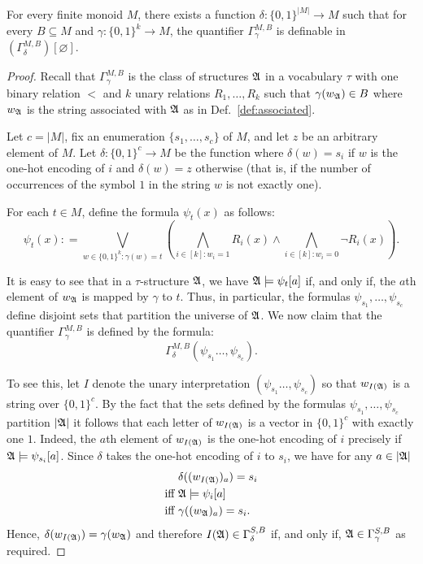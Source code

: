\documentclass[a4paper,UKenglish,cleveref, autoref, thm-restate, anonymous]{lipics-v2021}
\begin{document}
\begin{lemma}\label{lem:finitetuple}
    For every finite monoid $M$, there exists a function $\delta : \{0,1\}^{|M|} \rightarrow M$ such that for every $B \subseteq M$ and $\gamma : \{0,1\}^k \rightarrow M$, the quantifier $\Gamma^{M,B}_{\gamma}$ is definable in $(\Gamma^{M,B}_{\delta})[\varnothing]$.
  \end{lemma}
  \begin{proof}
    Recall that $\Gamma^{M,B}_{\gamma}$ is the class of structures $\mathfrak{A}$ in a vocabulary $\tau$ with one binary relation $<$ and $k$ unary relations $R_1,\ldots,R_k$ such that $\gamma(w_{\mathfrak{A}}) \in B$ where $w_{\mathfrak{A}}$ is the string associated with $\mathfrak{A}$ as in Def.~\ref{def:associated}.

        Let $c = |M|$, fix an enumeration $\{s_1,\ldots,s_c\}$ of $M$, and let $z$ be an arbitrary element of $M$.  Let $\delta : \{0,1\}^c \rightarrow M$ be the function where $\delta(w) = s_i$ if $w$ is the one-hot encoding of $i$ and $\delta(w) = z$ otherwise (that is, if the number of occurrences of the symbol $1$ in the string $w$ is not exactly one).

        For each $t \in M$, define the formula $\psi_t(x)$ as follows:
        $$ \psi_t(x) : = \bigvee_{w \in \{0,1\}^k : \gamma(w) = t} \left( \bigwedge_{i \in [k] : w_i = 1} R_i(x) \land \bigwedge_{i \in [k] : w_i = 0} \neg R_i(x) \right).$$

        It is easy to see that in a $\tau$-structure $\mathfrak{A}$, we have $\mathfrak{A} \models \psi_t[a]$ if, and only if, the $a$th element of $w_{\mathfrak{A}}$ is mapped by $\gamma$ to $t$.  Thus, in particular, the formulas $\psi_{s_1},\ldots,\psi_{s_c}$ define disjoint sets that partition the universe of $\mathfrak{A}$.  We now claim that the quantifier $\Gamma^{M,B}_{\gamma}$ is defined by the formula:
          $$ \Gamma^{M,B}_{\delta}(\psi_{s_1}\ldots,\psi_{s_c}).$$

          To see this, let $I$ denote the unary interpretation $(\psi_{s_1}\ldots,\psi_{s_c})$ so that $w_{I(\mathfrak{A})}$ is a string over $\{0,1\}^c$.  By the fact that the sets defined by the formulas $\psi_{s_1},\ldots,\psi_{s_c}$ partition $|\mathfrak{A}|$ it follows that each letter of $w_{I(\mathfrak{A})}$ is a vector in $\{0,1\}^c$ with exactly one $1$.  Indeed, the $a$th element of $w_{I(\mathfrak{A})}$ is the one-hot encoding of $i$ precisely if $\mathfrak{A} \models \psi_{s_i}[a]$.  Since $\delta$ takes the one-hot encoding of $i$ to $s_i$, we have for any $a \in |\mathfrak{A}|$
          \begin{align*}
            & \delta((w_{I(\mathfrak{A})})_a)  =  s_i \\
            \text{iff}\ & \mathfrak{A} \models\psi_i[a] \\
            \text{iff}\ & \gamma((w_{\mathfrak{A}})_a) = s_i.
          \end{align*}
            Hence, $\delta(w_{I(\mathfrak{A})}) = \gamma(w_{\mathfrak{A}})$ and therefore $I(\mathfrak{A}) \in \Gamma^{S,B}_{\delta}$ if, and only if, $\mathfrak{A} \in \Gamma^{S,B}_{\gamma}$ as required.
        
  \end{proof}
\end{document}
